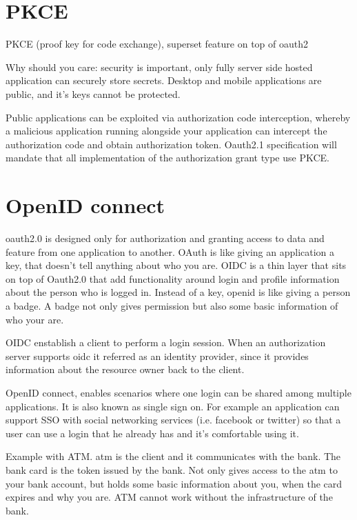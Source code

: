 \documentclass{style}
\begin{document}
\section{PKCE}
PKCE (proof key for code exchange), superset feature on top of oauth2


Why should you care:
security is important, only fully server side hosted application can securely
store secrets. Desktop and mobile applications are public, and it's keys cannot
be protected.

Public applications can be exploited via authorization code interception,
whereby a malicious application running alongside your application can intercept
the authorization code and obtain authorization token.
Oauth2.1 specification will mandate that all implementation of the authorization
grant type use PKCE.

\section{OpenID connect}

oauth2.0 is designed only for authorization and granting access to data and
feature from one application to another.
OAuth is like giving an application a key, that doesn't tell anything about who
you are.
OIDC is a thin layer that sits on top of Oauth2.0 that add functionality around
login and profile information about the person who is logged in.
Instead of a key, openid is like giving a person a badge. A badge not only gives
permission but also some basic information of who your are.

OIDC enstablish a client to perform a login session.
When an authorization server supports oidc it referred as an identity provider,
since it provides information about the resource owner back to the client.

OpenID connect, enables scenarios where one login can be shared among multiple
applications. It is also known as single sign on.
For example an application can support SSO with social networking services (i.e.
facebook or twitter) so that a user can use a login that he already has and it's
comfortable using it.

Example with ATM. atm is the client and it communicates with the bank. The bank
card is the token issued by the bank. Not only gives access to the atm to your
bank account, but holds some basic information about you, when the card expires
and why you are.
ATM cannot work without the infrastructure of the bank.
\end{document}
